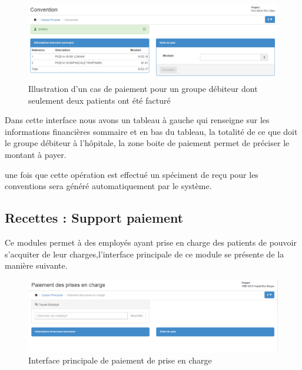 \documentclass[12pt,a4paper]{report}
\begin{document}
\begin{figure}[h]
\begin{center}
\includegraphics[width=14cm]{pic/conventionMenu2.png}
\end{center}
\caption{Illustration d'un cas de paiement pour un groupe débiteur dont seulement deux patients ont été facturé}
\label{Illustration d'un cas de paiement pour un groupe débiteur dont seulement deux patients ont été facturé}
\end{figure}
 
Dans cette interface nous avons un tableau à gauche qui renseigne sur les informations financières sommaire et en bas du tableau, la totalité de ce que doit le groupe débiteur à l'hôpitale, la zone boite de paiement permet de préciser le montant à payer.

une fois que cette opération est effectué un spéciment de reçu pour les conventions sera généré automatiquement par le système.


\newpage
\subsection{Recettes : Support paiement}
Ce modules permet à des employés ayant prise en charge des patients de pouvoir s'acquiter de leur charges,l'interface principale de ce module se présente de la manière suivante.

\begin{figure}[h]
\begin{center}
\includegraphics[width=14cm]{pic/InterFacePriseCharge.png}
\end{center}
\caption{Interface principale de paiement de prise en charge}
\label{Interface principale de paiement de prise en charge}
\end{figure}
\end{document}
